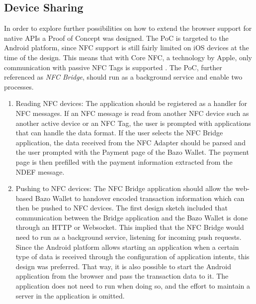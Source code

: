 \subsection{Device Sharing}\label{pocnfcbridge}
In order to explore further possibilities on how to extend the browser support for native APIs a Proof of Concept was designed. The PoC is targeted to the Android platform, since NFC support is still fairly limited on iOS devices at the time of the design. This means that with Core NFC, a technology by Apple, only communication with passive NFC Tags is supported \cite{corenfc}. The PoC, further referenced as \textit{NFC Bridge}, should run as a background service and enable two processes.
\begin{enumerate}
\item Reading NFC devices:
The application should be registered as a handler for NFC messages. If an NFC message is read from another NFC device such as another active device or an NFC Tag, the user is prompted with applications that can handle the data format. If the user selects the NFC Bridge application, the data received from the NFC Adapter should be parsed and the user prompted with the Payment page of the Bazo Wallet. The payment page is then prefilled with the payment information extracted from the NDEF message.
\item Pushing to NFC devices: The NFC Bridge application should allow the web-based Bazo Wallet to handover encoded transaction information which can then be pushed to NFC devices.
The first design sketch included that communication between the Bridge application and the Bazo Wallet is done through an HTTP or Websocket. This implied that the NFC Bridge would need to run as a background service, listening for incoming push requests.
Since the Android platform allows starting an application when a certain type of data is received through the configuration of application intents, this design was preferred. That way, it is also possible to start the Android application from the browser and pass the transaction data to it. The application does not need to run when doing so, and the effort to maintain a server in the application is omitted.
\end{enumerate}

